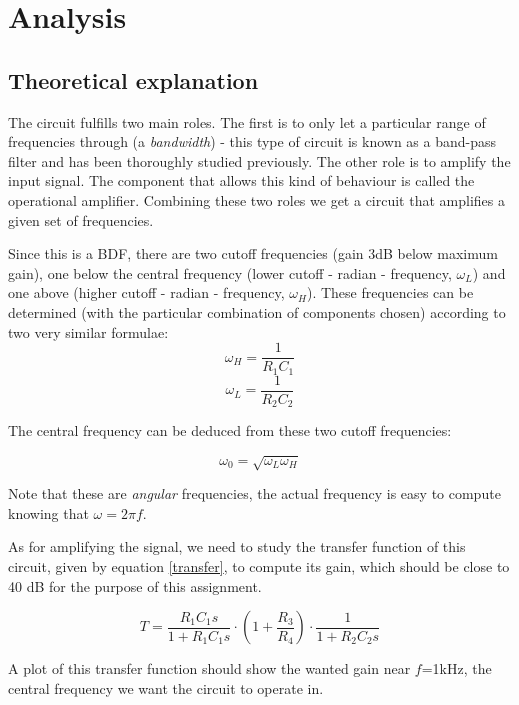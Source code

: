 \section{Analysis}
\label{sec:analysis}
\subsection{Theoretical explanation}

The circuit fulfills two main roles. The first is to only let a particular range of frequencies through (a \emph{bandwidth}) - this type of circuit is known as a band-pass filter and has been thoroughly studied previously. The other role is to amplify the input signal. The component that allows this kind of behaviour is called the operational amplifier. Combining these two roles we get a circuit that amplifies a given set of frequencies.

Since this is a BDF, there are two cutoff frequencies (gain 3dB below maximum gain), one below the central frequency (lower cutoff - radian - frequency, $\omega_L$) and one above (higher cutoff - radian - frequency, $\omega_H$). These frequencies can be determined (with the particular combination of components chosen) according to two very similar formulae:
\begin{equation}
    \omega_H = \frac{1}{R_1 C_1}
\end{equation}
\begin{equation}
    \omega_L = \frac{1}{R_2 C_2}
\end{equation}

The central frequency can be deduced from these two cutoff frequencies:

\begin{equation}
    \omega_0 = \sqrt{\omega_L \omega_H}
\end{equation}

Note that these are \emph{angular} frequencies, the actual frequency is easy to compute knowing that $\omega = 2\pi f$.

As for amplifying the signal, we need to study the transfer function of this circuit, given by equation \ref{transfer}, to compute its gain, which should be close to 40 dB for the purpose of this assignment.

\begin{equation}
    T = \frac{R_1 C_1 s}{1+R_1 C_1 s} \cdot (1+\frac{R_3}{R_4}) \cdot \frac{1}{1+R_2 C_2 s}
    \label{transfer}
\end{equation}

A plot of this transfer function should show the wanted gain near $f$=1kHz, the central frequency we want the circuit to operate in.


